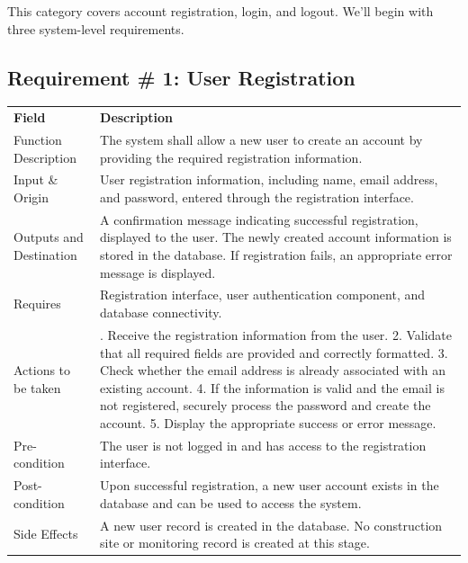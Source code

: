 \documentclass[12pt,a4paper]{report}
\begin{document}
This category covers account registration, login, and logout. We'll
begin with three system-level requirements.

\subsection{Requirement \# 1: User
Registration}\label{requirement-1-user-registration}

\begin{longtable}[]{@{}
  >{\raggedright\arraybackslash}p{}
  >{\raggedright\arraybackslash}p{}@{}}
\toprule\noalign{}
\endhead
\bottomrule\noalign{}
\endlastfoot
\textbf{Field} & \textbf{Description} \\
Function Description & The system shall allow a new user to create an
account by providing the required registration information. \\
Input \& Origin & User registration information, including name, email
address, and password, entered through the registration interface. \\
Outputs and Destination & A confirmation message indicating successful
registration, displayed to the user. The newly created account
information is stored in the database. If registration fails, an
appropriate error message is displayed. \\
Requires & Registration interface, user authentication component, and
database connectivity. \\
Actions to be taken & 1. Receive the registration information from the
user. 2. Validate that all required fields are provided and correctly
formatted. 3. Check whether the email address is already associated with
an existing account. 4. If the information is valid and the email is not
registered, securely process the password and create the account. 5.
Display the appropriate success or error message. \\
Pre-condition & The user is not logged in and has access to the
registration interface. \\
Post-condition & Upon successful registration, a new user account exists
in the database and can be used to access the system. \\
Side Effects & A new user record is created in the database. No
construction site or monitoring record is created at this stage. \\
\end{longtable}
\end{document}
